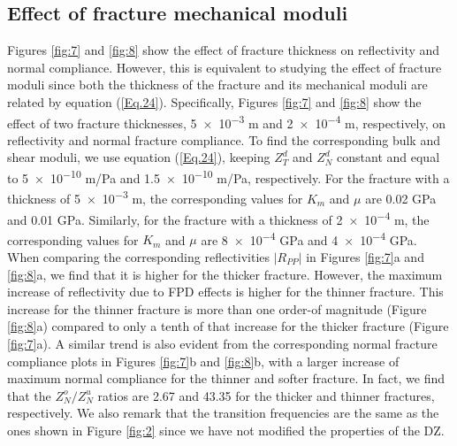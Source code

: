 \documentclass[draft]{agujournal2019}
\begin{document}
\subsection{Effect of fracture mechanical  moduli}
Figures \ref{fig:7} and \ref{fig:8} show the effect of fracture thickness on reflectivity and normal compliance. However, this is equivalent to studying the effect of fracture moduli since both the thickness of the fracture and its mechanical moduli are related by equation (\ref{Eq.24}). Specifically, Figures \ref{fig:7} and \ref{fig:8} show the effect of two fracture thicknesses, \num{5e-3} m and \num{2e-4} m, respectively, on reflectivity and normal fracture compliance. To find the corresponding bulk and shear moduli, we use equation (\ref{Eq.24}), keeping  $Z_T^d$ and $Z_N^d$ constant and equal to 
\num{5e-10} m/Pa and \num{1.5e-10} m/Pa, respectively. For the fracture with a  thickness of \num{5e-3} m, the corresponding values for $K_m$ and $\mu$ are 0.02 GPa and 0.01 GPa. Similarly, for the fracture  with a thickness of \num{2e-4} m, the corresponding values for $K_m$ and $\mu$ are  \num{8e-4} GPa and  \num{4e-4} GPa. When comparing the corresponding reflectivities $|R_{PP}|$ in Figures \ref{fig:7}a and \ref{fig:8}a, we find that it is higher for the thicker fracture. However, the maximum increase of reflectivity due to FPD effects is higher for the thinner fracture. This increase for the thinner fracture is more than one order-of magnitude (Figure \ref{fig:8}a) compared to only a tenth of that increase for the thicker fracture (Figure \ref{fig:7}a). 
A similar trend is also evident from the corresponding  normal fracture compliance plots in Figures \ref{fig:7}b and \ref{fig:8}b, with a larger increase of maximum normal compliance for the thinner and softer fracture. In fact, we find that the  $Z_N^o/Z_N^u$ ratios are 2.67 and 43.35 for the thicker and thinner fractures, respectively. We also remark that the transition frequencies are the same as the ones shown in Figure \ref{fig:2} since we have not modified the properties of the DZ.
\end{document}
